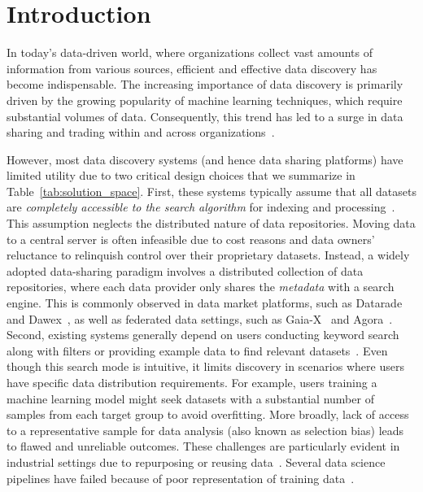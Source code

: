 
\section{Introduction}
\label{sec:intro}

In today's data-driven world, where organizations collect vast amounts of information from various sources, efficient and effective data discovery has become indispensable.
The increasing importance of data discovery is primarily driven by the growing popularity of machine learning techniques, which require substantial volumes of data.
Consequently, this trend has led to a surge in data sharing and trading within and across organizations~\cite{azcoitia_survey_2022, kennedy_revisiting_2022}.

However, most data discovery systems (and hence data sharing platforms) have limited utility due to two critical design choices that we summarize in Table~\ref{tab:solution_space}.
First, these systems typically assume that all datasets are \emph{completely accessible to the search algorithm} for indexing and processing~\cite{castelo_auctus_2021, castro_fernandez_aurum_2018, galhotra_metam_2023, gong_ver_2023}.
This assumption neglects the distributed nature of data repositories.
Moving data to a central server is often infeasible due to cost reasons and data owners' reluctance to relinquish control over their proprietary datasets.
Instead, a widely adopted data-sharing paradigm involves a distributed collection of data repositories, where each data provider only shares the \emph{metadata} with a search engine.
This is commonly observed in data market platforms, such as Datarade~\cite{datarade_find_2024} and Dawex~\cite{dawex_data_2024}, as well as federated data settings, such as Gaia-X~\cite{braud_road_2021} and Agora~\cite{traub_agora_2021}.
Second, existing systems generally depend on users conducting keyword search along with filters or providing example data to find relevant datasets~\cite{castelo_auctus_2021, noy_google_2019}.
Even though this search mode is intuitive, it limits discovery in scenarios where users have specific data distribution requirements.
For example, users training a machine learning model might seek datasets with a substantial number of samples from each target group to avoid overfitting.
More broadly, lack of access to a representative sample for data analysis (also known as selection bias) leads to flawed and unreliable outcomes.
These challenges are particularly evident in industrial settings due to repurposing or reusing data~\cite{bethlehem_selection_2010, culotta_reducing_2014, greenacre_importance_2016, zhu_consistent_2023}.
Several data science pipelines have failed because of poor representation of training data~\cite{dastin_amazon_2022, mulshine_major_2015, rose_are_2010, townsend_most_2017}.

